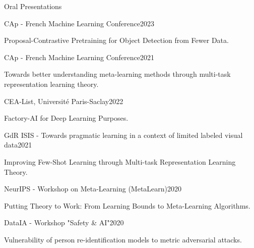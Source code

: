\documentclass{resume} %
\begin{document}
\begin{rSection}{Oral Presentations}
    \begin{rSubsection}{CAp - French Machine Learning Conference}{2023}{}{}
            \item[] Proposal-Contrastive Pretraining for Object Detection from Fewer Data.
    \end{rSubsection}
    
    \begin{rSubsection}{CAp - French Machine Learning Conference}{2021}{}{}
            \item[] Towards better understanding meta-learning methods through multi-task representation learning theory.
    \end{rSubsection}

    \begin{rSubsection}{CEA-List, Université Paris-Saclay}{2022}{}{}
        \item[] Factory-AI for Deep Learning Purposes. 
    \end{rSubsection}

    \begin{rSubsection}{GdR ISIS - Towards pragmatic learning in a context of limited labeled visual data}{2021}{}{}
    \item[] Improving Few-Shot Learning through Multi-task Representation Learning Theory.
    \end{rSubsection}

    \begin{rSubsection}{NeurIPS - Workshop on Meta-Learning (MetaLearn)}{2020}{}{}
        \item[] Putting Theory to Work: From Learning Bounds to Meta-Learning Algorithms.
\end{rSubsection}

    \begin{rSubsection}{DataIA - Workshop "Safety \& AI"}{2020}{}{}
        \item[] Vulnerability of person re-identification models to metric adversarial attacks.
    \end{rSubsection}
    
    \end{rSection}


\end{document}
